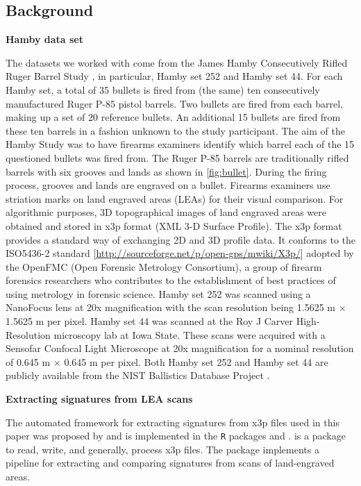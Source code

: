 \hypertarget{background}{%
\subsection{Background}\label{background}}

\textbf{Hamby data set}

The datasets we worked with come from the James Hamby Consecutively
Rifled Ruger Barrel Study \citep{brundage, hamby, Hamby:2019}, in
particular, Hamby set 252 and Hamby set 44. For each Hamby set, a total
of 35 bullets is fired from (the same) ten consecutively manufactured
Ruger P-85 pistol barrels. Two bullets are fired from each barrel,
making up a set of 20 reference bullets. An additional 15 bullets are
fired from these ten barrels in a fashion unknown to the study
participant. The aim of the Hamby Study was to have firearms examiners
identify which barrel each of the 15 questioned bullets was fired from.
The Ruger P-85 barrels are traditionally rifled barrels with six grooves
and lands as shown in \autoref{fig:bullet}. During the firing process,
grooves and lands are engraved on a bullet. Firearms examiners use
striation marks on land engraved areas (LEAs) for their visual
comparison. For algorithmic purposes, 3D topographical images of land
engraved areas were obtained and stored in x3p format (XML 3-D Surface
Profile). The x3p format provides a standard way of exchanging 2D and 3D
profile data. It conforms to the ISO5436-2 standard
{[}\url{http://sourceforge.net/p/open-gps/mwiki/X3p/}{]} adopted by the
OpenFMC (Open Forensic Metrology Consortium), a group of firearm
forensics researchers who contributes to the establishment of best
practices of using metrology in forensic science. Hamby set 252 was
scanned using a NanoFocus lens at 20x magnification with the scan
resolution being 1.5625 \textmu m \(\times\) 1.5625 \textmu m per pixel.
Hamby set 44 was scanned at the Roy J Carver High-Resolution microscopy
lab at Iowa State. These scans were acquired with a Sensofar Confocal
Light Microscope at 20x magnification for a nominal resolution of 0.645
\textmu m \(\times\) 0.645 \textmu m per pixel. Both Hamby set 252 and
Hamby set 44 are publicly available from the NIST Ballistics Database
Project \citep{nistdb}.

\textbf{Extracting signatures from LEA scans}

The automated framework for extracting signatures from x3p files used in
this paper was proposed by \citet{aoas} and is implemented in the
\texttt{R} packages  \citep{x3ptools} and
 \citep{bulletxtrctr}.  is a package to
read, write, and generally, process x3p files. The 
package implements a pipeline for extracting and comparing signatures
from scans of land-engraved areas.

